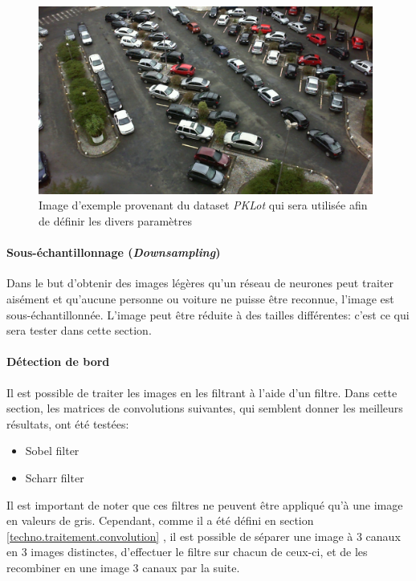 \begin{figure}[ht]
    \includegraphics[width=110mm]{img/conception/pklot_park.jpg}
    \centering
    \caption{Image d'exemple provenant du dataset \textit{PKLot} qui sera utilisée afin de définir les divers paramètres}
    \label{fig:pklot-park}
\end{figure}


\paragraph{Sous-échantillonnage (\textit{Downsampling})}
Dans le but d'obtenir des images légères qu'un réseau de neurones peut traiter aisément et qu'aucune personne ou voiture ne puisse être reconnue, l'image est sous-échantillonnée. L'image peut être réduite à des tailles différentes: c'est ce qui sera tester dans cette section.

\paragraph{Détection de bord}
Il est possible de traiter les images en les filtrant à l'aide d'un filtre. Dans cette section, les matrices de convolutions suivantes, qui semblent donner les meilleurs résultats, ont été testées:
\begin{itemize}
    \item Sobel filter
    \item Scharr filter
\end{itemize} 

Il est important de noter que ces filtres ne peuvent être appliqué qu'à une image en valeurs de gris. Cependant, comme il a été défini en section \ref{techno.traitement.convolution} , il est possible de séparer une image à 3 canaux en 3 images distinctes, d'effectuer le filtre sur chacun de ceux-ci, et de les recombiner en une image 3 canaux par la suite. 

